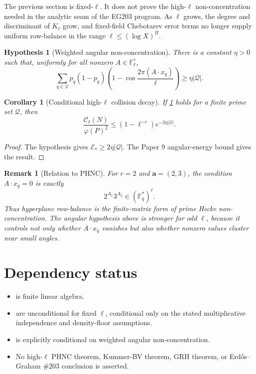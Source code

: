 \documentclass[11pt]{article}
\newtheorem{corollary}{Corollary}
\newtheorem{hypothesis}{Hypothesis}
\newtheorem{remark}{Remark}
\newcommand{\F}{\mathbb F}
\begin{document}
The previous section is fixed-\(\ell\).  It does not prove the high-\(\ell\) non-concentration needed in the analytic seam of the EG203 program.  As \(\ell\) grows, the degree and discriminant of \(K_\ell\) grow, and fixed-field Chebotarev error terms no longer supply uniform row-balance in the range \(\ell\le(\log X)^B\).

\begin{hypothesis}[Weighted angular non-concentration]\label{H:angular-nc}
There is a constant \(\eta>0\) such that, uniformly for all nonzero \(A\in\F_\ell^r\),
\[
\sum_{q\in\mathcal Q}
p_q(1-p_q)
\left(1-\cos\frac{2\pi(A\cdot x_q)}{\ell}\right)
\ge
\eta|\mathcal Q|.
\]
\end{hypothesis}

\begin{corollary}[Conditional high-\(\ell\) collision decay]\label{C:conditional-high-ell}
If \cref{H:angular-nc} holds for a finite prime set \(\mathcal Q\), then
\[
\frac{\mathcal C_\ell(N)}{\varphi(P)^2}
\le
(1-\ell^{-r})e^{-2\eta|\mathcal Q|}.
\]
\end{corollary}

\begin{proof}
The hypothesis gives \(\mathcal E_*\ge2\eta|\mathcal Q|\).  The Paper 9 angular-energy bound gives the result.
\end{proof}

\begin{remark}[Relation to PHNC]
For \(r=2\) and \(\mathbf a=(2,3)\), the condition \(A\cdot x_q=0\) is exactly
\[
2^{A_1}3^{A_2}\in(\F_q^*)^\ell.
\]
Thus hyperplane row-balance is the finite-matrix form of prime Hecke non-concentration.  The angular hypothesis above is stronger for odd \(\ell\), because it controls not only whether \(A\cdot x_q\) vanishes but also whether nonzero values cluster near small angles.
\end{remark}

\section{Dependency status}

\begin{itemize}[leftmargin=2em]
\item {} is finite linear algebra.
\item {} are unconditional for fixed \(\ell\), conditional only on the stated multiplicative independence and density-floor assumptions.
\item {} is explicitly conditional on weighted angular non-concentration.
\item No high-\(\ell\) PHNC theorem, Kummer-BV theorem, GRH theorem, or Erd\H{o}s--Graham \#203 conclusion is asserted.
\end{itemize}
\end{document}
